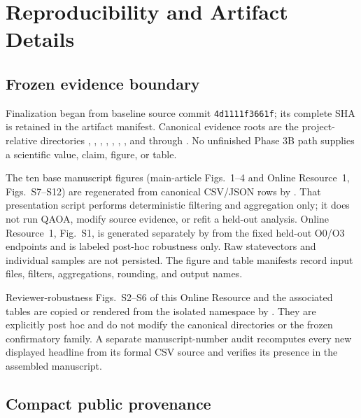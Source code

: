 \section{Reproducibility and Artifact Details}
\label{app:artifact}

\subsection{Frozen evidence boundary}

Finalization began from baseline source commit
\texttt{4d1111f3661f}; its complete SHA is retained in the artifact manifest.
Canonical evidence roots are
the project-relative directories
,
,
,
,
,
,
, and
 through
. No unfinished Phase 3B path supplies a
scientific value, claim, figure, or table.

The ten base manuscript figures (main-article Figs.~1--4 and Online
Resource~1, Figs.~S7--S12) are
regenerated from canonical CSV/JSON rows by
. That presentation script
performs deterministic filtering and aggregation only; it does not run QAOA,
modify source evidence, or refit a held-out analysis. Online Resource~1,
Fig.~S1, is generated separately by
 from the
fixed held-out O0/O3 endpoints and is labeled post-hoc robustness only. Raw
statevectors and individual samples are not persisted. The figure and table
manifests record input files, filters, aggregations, rounding, and output
names.

Reviewer-robustness Figs.~S2--S6 of this Online Resource and the associated
tables are copied or rendered from the isolated
 namespace by
.
They are explicitly post hoc and do not modify the canonical directories or
the frozen confirmatory family. A separate manuscript-number audit recomputes
every new displayed headline from its formal CSV source and verifies its
presence in the assembled manuscript.

\subsection{Compact public provenance}

